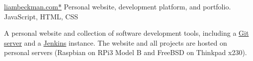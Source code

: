 \showoff
{\textcolor{my-blue}{\href{https://liambeckman.com}{liambeckman.com\textcolor{my-red}{*}}}}
{Personal website, development platform, and portfolio.}
{JavaScript, HTML, CSS}
{}


A personal website and collection of software development tools, including a \textcolor{my-blue}{\href{https://git.liambeckman.com/liam}{Git server}} and a \textcolor{my-blue}{\href{https://liambeckman.com/jenkins}{Jenkins}} instance. The website and all projects are hosted on personal servers (Raspbian on RPi3 Model B and FreeBSD on Thinkpad x230).

